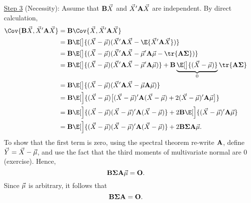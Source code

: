 \begin{Theorem}{}{}
    \underline{Step 3} (Necessity): Assume that $ \mathbf{B}\vec{X} $
    and $ \vec{X}'\mathbf{A}\vec{X} $ are independent. By direct calculation,
    \begin{align*}
        \Cov{\Matrix{B}\Vector{X},\Vector{X}'\Matrix{A}\Vector{X}}
         & =\Matrix{B}\Cov{\Vector{X},\Vector{X}' \Matrix{A}\Vector{X}}                                                                                                              \\
         & =\Matrix{B}\E[\big]{(\Vector{X}-\Vector{\mu})(\Vector{X}'\Matrix{A}\Vector{X}-\E{\Vector{X}'\Matrix{A}\Vector{X}})}                                                       \\
         & =\Matrix{B}\E[\big]{(\Vector{X}-\Vector{\mu})(\Vector{X}'\Matrix{A}\Vector{X}-\Vector{\mu}'\Matrix{A}\Vector{\mu}-\tr{\Matrix{A\Sigma}})}                                 \\
         & =\Matrix{B}\E[\big]{(\Vector{X}-\Vector{\mu})(\Vector{X}'\Matrix{A}\Vector{X}-\Vector{\mu}'\Matrix{A}\Vector{\mu})}
        +\Matrix{B}\underbrace{\E[\big]{(\Vector{X}-\Vector{\mu})}}_{0}\tr{\Matrix{A\Sigma}}                                                                                         \\
         & =\Matrix{B}\E[\big]{(\Vector{X}-\Vector{\mu})(\Vector{X}'\Matrix{A}\Vector{X}-\Vector{\mu}\Matrix{A}\Vector{\mu})}                                                        \\
         & =\Matrix{B}\E[\Big]{(\Vector{X}-\Vector{\mu})\bigl[(\Vector{X}-\Vector{\mu})'\Matrix{A}(\Vector{X}-\Vector{\mu})+2(\Vector{X}-\Vector{\mu})'\Matrix{A}\Vector{\mu}\bigr]} \\
         & =\Matrix{B}\E[\Big]{(\Vector{X}-\Vector{\mu})(\Vector{X}-\Vector{\mu})'\Matrix{A}(\Vector{X}-\Vector{\mu})}
        +2 \Matrix{B}\E[\Big]{(\Vector{X}-\Vector{\mu})'\Matrix{A}\Vector{\mu}}                                                                                                      \\
         & =\Matrix{B}\E[\Big]{(\Vector{X}-\Vector{\mu})(\Vector{X}-\Vector{\mu})'\Matrix{A}(\Vector{X}-\Vector{\mu})}
        +2 \Matrix{B\Sigma A}\Vector{\mu}.
    \end{align*}
    To show that the first term is zero, using the spectral theorem re-write $ \mathbf{A} $,
    define $ \vec{Y}=\vec{X}-\vec{\mu} $, and use the fact that the third moments
    of multivariate normal are $ 0 $ (exercise).
    Hence,
    \[ \mathbf{B\Sigma A}\vec{\mu}=\mathbf{O}. \]
    Since $ \vec{\mu} $ is arbitrary, it follows that
    \[ \mathbf{B\Sigma A}=\mathbf{O}. \]
\end{Theorem}
